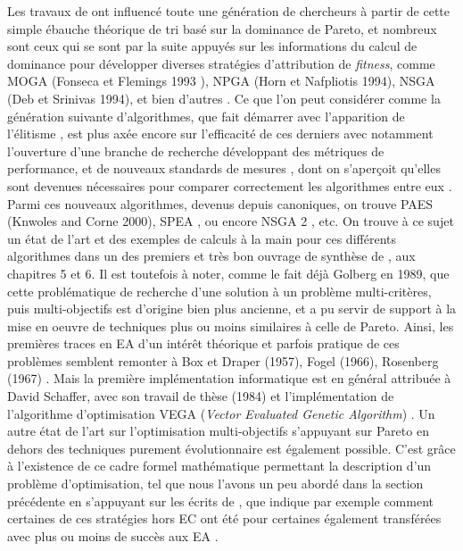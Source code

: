 Les travaux de \textcite{Goldberg1989} ont influencé toute une génération de chercheurs à partir de cette simple ébauche théorique de tri basé sur la dominance de Pareto, et nombreux sont ceux qui se sont par la suite appuyés \autocite[175, 235]{Deb2001} sur les informations du calcul de dominance pour développer diverses stratégies d'attribution de \textit{fitness}, comme MOGA (Fonseca et Flemings 1993 \autocite{Fonseca1993}), NPGA (Horn et Nafpliotis 1994), NSGA (Deb et Srinivas 1994), et bien d'autres \autocite[14]{Zitzler1999a}. Ce que l'on peut considérer comme la génération suivante d'algorithmes, que \textcite{Coello2006}  fait démarrer avec l'apparition de l'élitisme , est plus axée encore sur l'efficacité de ces derniers avec notamment l'ouverture d'une branche de recherche développant des métriques de performance, et de nouveaux standards de mesures \autocites{Coello2006, Zitzler2003,Huband2006}, dont on s'aperçoit qu'elles sont devenues nécessaires pour comparer correctement les algorithmes entre eux \autocite[14-15]{Zitzler1999a}. Parmi ces nouveaux algorithmes, devenus depuis canoniques, on trouve PAES (Knwoles and Corne 2000), SPEA \autocite{Zitzler1999b}, ou encore NSGA 2 \autocite{Deb2000a}, etc. On trouve à ce sujet un état de l'art et des exemples de calculs à la main pour ces différents algorithmes dans un des premiers et très bon ouvrage de synthèse de \textcite{Deb2001}, aux chapitres 5 et 6. Il est toutefois à noter, comme le fait déjà Golberg en 1989, que cette problématique de recherche d'une solution à un problème multi-critères, puis multi-objectifs est d'origine bien plus ancienne, et a pu servir de support à la mise en oeuvre de techniques plus ou moins similaires à celle de Pareto. Ainsi, les premières traces en EA d'un intérêt théorique et parfois pratique de ces problèmes semblent remonter à Box et Draper (1957), Fogel (1966), Rosenberg (1967) \autocite[174-175]{Deb2001}. Mais la première implémentation informatique est en général attribuée à David Schaffer, avec son travail de thèse (1984) et l'implémentation de l'algorithme d'optimisation VEGA (\textit{Vector Evaluated Genetic Algorithm}) \autocite{Schaffer1985}. Un autre état de l'art sur l'optimisation multi-objectifs s'appuyant sur Pareto en dehors des techniques purement évolutionnaire est également possible. C'est grâce à l'existence de ce cadre formel mathématique permettant la description d'un problème d'optimisation, tel que nous l'avons un peu abordé dans la section précédente en s'appuyant sur les écrits de \autocite{Weise2011}, que \textcite[50-79]{Deb2001} indique par exemple comment certaines de ces stratégies hors EC ont été pour certaines également transférées avec plus ou moins de succès aux EA \textcite[171-237]{Deb2001}.

